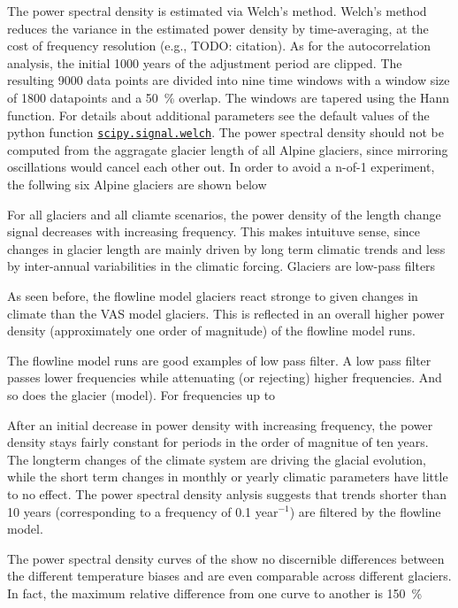       The power spectral density is estimated via Welch's method. Welch's method reduces the variance in the estimated power density by time-averaging, at the cost of frequency resolution (e.g., TODO: citation). As for the autocorrelation analysis, the initial 1000 years of the adjustment period are clipped. The resulting 9000 data points are divided into nine time windows with a window size of 1800 datapoints and a \SI{50}{\percent} overlap. The windows are tapered using the Hann function. For details about additional parameters see the default values of the python function \href{https://docs.scipy.org/doc/scipy/reference/generated/scipy.signal.welch.html}{\lstinline`scipy.signal.welch`}. The power spectral density should not be computed from the aggragate glacier length of all Alpine glaciers, since mirroring oscillations would cancel each other out. In order to avoid a n-of-1 experiment, the follwing six Alpine glaciers are shown below %

      For all glaciers and all cliamte scenarios, the power density of the length change signal decreases with increasing frequency. This makes intuituve sense, since changes in glacier length are mainly driven by long term climatic trends and less by inter-annual variabilities in the climatic forcing. Glaciers are low-pass filters

      As seen before, the flowline model glaciers react stronge to given changes in climate than the VAS model glaciers. This is reflected in an overall higher power density (approximately one order of magnitude) of the flowline model runs.

      The flowline model runs are good examples of low pass filter. A low pass filter passes lower frequencies while attenuating (or rejecting) higher frequencies. And so does the glacier (model). For frequencies up to 

      After an initial decrease in power density with increasing frequency, the power density stays fairly constant for periods in the order of magnitue of ten years. The longterm changes of the climate system are driving the glacial evolution, while the short term changes in monthly or yearly climatic parameters have little to no effect. The power spectral density anlysis suggests that trends  shorter than 10 years (corresponding to a frequency of 0.1 year$^{-1}$) are filtered by the flowline model.

      The power spectral density curves of the \vas{} show no discernible differences between the different temperature biases and are even comparable across different glaciers. In fact, the maximum relative difference from one curve to another is \SI{150}{\percent}


